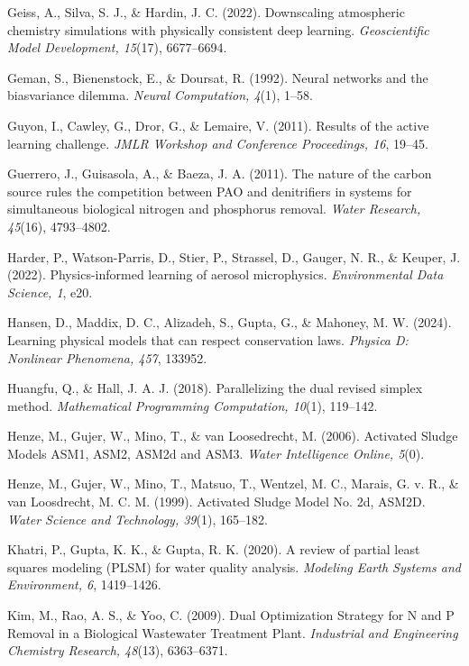 \documentclass[a4paper,fleqn]{cas-sc}
\begin{document}
\noindent Geiss, A., Silva, S. J., \& Hardin, J. C. (2022). Downscaling atmospheric chemistry simulations with physically consistent deep learning. \textit{Geoscientific Model Development, 15}(17), 6677--6694.

\noindent Geman, S., Bienenstock, E., \& Doursat, R. (1992). Neural networks and the bias\/variance dilemma. \textit{Neural Computation, 4}(1), 1--58.

\noindent Guyon, I., Cawley, G., Dror, G., \& Lemaire, V. (2011). Results of the active learning challenge. \textit{JMLR Workshop and Conference Proceedings, 16}, 19--45.

\noindent Guerrero, J., Guisasola, A., \& Baeza, J. A. (2011). The nature of the carbon source rules the competition between PAO and denitrifiers in systems for simultaneous biological nitrogen and phosphorus removal. \textit{Water Research, 45}(16), 4793--4802.

\noindent Harder, P., Watson-Parris, D., Stier, P., Strassel, D., Gauger, N. R., \& Keuper, J. (2022). Physics-informed learning of aerosol microphysics. \textit{Environmental Data Science, 1}, e20.

\noindent Hansen, D., Maddix, D. C., Alizadeh, S., Gupta, G., \& Mahoney, M. W. (2024). Learning physical models that can respect conservation laws. \textit{Physica D: Nonlinear Phenomena, 457}, 133952.

\noindent Huangfu, Q., \& Hall, J. A. J. (2018). Parallelizing the dual revised simplex method. \textit{Mathematical Programming Computation, 10}(1), 119--142.

\noindent Henze, M., Gujer, W., Mino, T., \& van Loosedrecht, M. (2006). Activated Sludge Models ASM1, ASM2, ASM2d and ASM3. \textit{Water Intelligence Online, 5}(0).

\noindent Henze, M., Gujer, W., Mino, T., Matsuo, T., Wentzel, M. C., Marais, G. v. R., \& van Loosdrecht, M. C. M. (1999). Activated Sludge Model No. 2d, ASM2D. \textit{Water Science and Technology, 39}(1), 165--182.

\noindent Khatri, P., Gupta, K. K., \& Gupta, R. K. (2020). A review of partial least squares modeling (PLSM) for water quality analysis. \textit{Modeling Earth Systems and Environment, 6}, 1419--1426.

\noindent Kim, M., Rao, A. S., \& Yoo, C. (2009). Dual Optimization Strategy for N and P Removal in a Biological Wastewater Treatment Plant. \textit{Industrial and Engineering Chemistry Research, 48}(13), 6363--6371.
\end{document}
